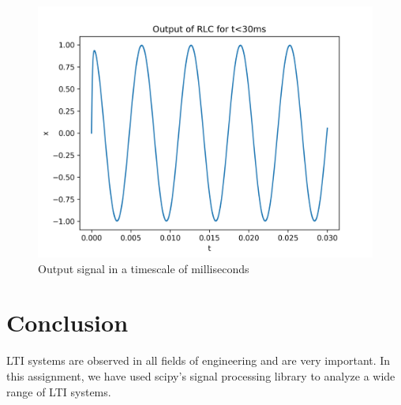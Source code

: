 \documentclass[11pt, a4paper]{article}
\begin{document}
\begin{figure}[!tbh]
\centering
\includegraphics[scale=0.6]{assgn7_plot11.png} 
\caption{Output signal in a timescale of milliseconds}
\label{fig11}
\end{figure}

\section*{Conclusion}
LTI systems are observed in all fields of engineering and are very important.
In this assignment, we have used scipy’s signal processing library to analyze a
wide range of LTI systems.
\end{document}
